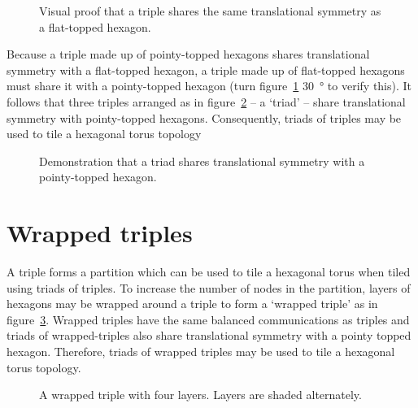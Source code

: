 		\begin{figure}
			\center
			
			\caption[Triples share translational symetry with flat-topped hexagons.]%
			{Visual proof that a triple shares the same translational
			symmetry as a flat-topped hexagon.}
			\label{fig:wrapped-triple-tiling}
		\end{figure}
		
		Because a triple made up of pointy-topped hexagons shares translational
		symmetry with a flat-topped hexagon, a triple made up of flat-topped
		hexagons must share it with a pointy-topped hexagon (turn
		figure~\ref{fig:wrapped-triple-tiling} \SI{30}{\degree} to verify this).
		It follows that three triples arranged as in figure~\ref{fig:triad-tiling}
		-- a `triad' -- share translational symmetry with pointy-topped hexagons.
		Consequently, triads of triples may be used to tile a hexagonal torus
		topology 
		
		\begin{figure}
			\center
			
			\caption[Triads of triples tile a hexagonal torus.]%
			{Demonstration that a triad shares translational symmetry with a
			pointy-topped hexagon.}
			\label{fig:triad-tiling}
		\end{figure}
	
	\section{Wrapped triples}
		
		A triple forms a partition which can be used to tile a hexagonal torus when
		tiled using triads of triples. To increase the number of nodes in the
		partition, layers of hexagons may be wrapped around a triple to form a
		`wrapped triple' as in figure~\ref{fig:wrapped-triple}. Wrapped triples
		have the same balanced communications as triples and triads of
		wrapped-triples also share translational symmetry with a pointy topped
		hexagon. Therefore, triads of wrapped triples may be used to tile a
		hexagonal torus topology.
		
		\begin{figure}
			\center
			
			\caption[A wrapped triple with four layers.]%
			{A wrapped triple with four layers. Layers are shaded alternately.}
			\label{fig:wrapped-triple}
		\end{figure}
		
